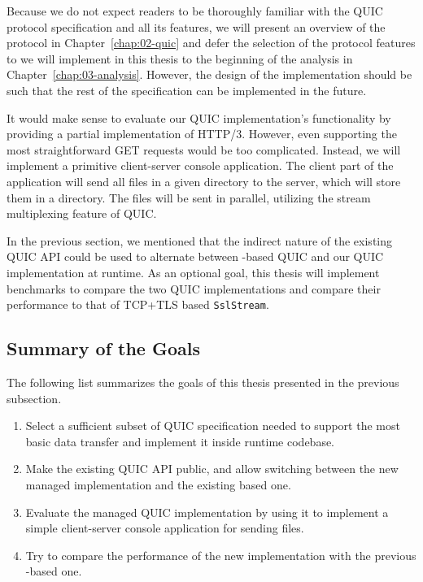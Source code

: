 Because we do not expect readers to be thoroughly familiar with the QUIC protocol specification and
all its features, we will present an overview of the protocol in Chapter~\ref{chap:02-quic} and
defer the selection of the protocol features to we will implement in this thesis to the beginning of
the analysis in Chapter~\ref{chap:03-analysis}. However, the design of the implementation should be
such that the rest of the specification can be implemented in the future.

It would make sense to evaluate our QUIC implementation's functionality by providing a partial
implementation of HTTP/3. However, even supporting the most straightforward GET requests would be
too complicated. Instead, we will implement a primitive client-server console application. The
client part of the application will send all files in a given directory to the server, which will
store them in a directory. The files will be sent in parallel, utilizing the stream multiplexing
feature of QUIC\@.

In the previous section, we mentioned that the indirect nature of the existing QUIC API could be
used to alternate between \libmsquic{}-based QUIC and our QUIC implementation at runtime. As an
optional goal, this thesis will implement benchmarks to compare the two QUIC implementations and
compare their performance to that of TCP+TLS based \texttt{SslStream}.

\subsection*{Summary of the Goals}

The following list summarizes the goals of this thesis presented in the previous subsection.

\begin{enumerate}

  \item Select a sufficient subset of QUIC specification needed to support the most basic data
transfer and implement it inside \dotnet{} runtime codebase.

  \item Make the existing QUIC API public, and allow switching between the new managed
implementation and the existing \libmsquic{} based one.

  \item Evaluate the managed QUIC implementation by using it to implement a simple client-server
console application for sending files.

  \item {} Try to compare the performance of the new
implementation with the previous \libmsquic{}-based one.

\end{enumerate}
